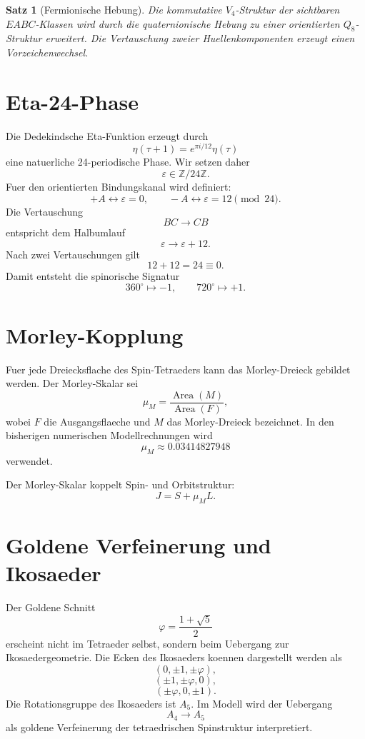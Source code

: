 \documentclass[11pt,a4paper]{article}
\newtheorem{satz}{Satz}[section]
\theoremstyle{definition}
\theoremstyle{remark}
\DeclareMathOperator{\Area}{Area}
\newcommand{\Z}{\mathbb Z}
\newcommand{\eps}{\varepsilon}
\newcommand{\phig}{\varphi}
\begin{document}
\begin{satz}[Fermionische Hebung]
Die kommutative \(V_4\)-Struktur der sichtbaren \(EABC\)-Klassen wird durch die
quaternionische Hebung zu einer orientierten \(Q_8\)-Struktur erweitert. Die
Vertauschung zweier Huellenkomponenten erzeugt einen Vorzeichenwechsel.
\end{satz}

\section{Eta-24-Phase}

Die Dedekindsche Eta-Funktion erzeugt durch
\[
\eta(\tau+1)=e^{\pi i/12}\eta(\tau)
\]
eine natuerliche 24-periodische Phase. Wir setzen daher
\[
\eps\in\Z/24\Z.
\]
Fuer den orientierten Bindungskanal wird definiert:
\[
+A\leftrightarrow \eps=0,
\qquad
-A\leftrightarrow \eps=12\pmod{24}.
\]
Die Vertauschung
\[
BC\longrightarrow CB
\]
entspricht dem Halbumlauf
\[
\eps\longrightarrow \eps+12.
\]
Nach zwei Vertauschungen gilt
\[
12+12=24\equiv 0.
\]
Damit entsteht die spinorische Signatur
\[
360^\circ\mapsto -1,
\qquad
720^\circ\mapsto +1.
\]

\section{Morley-Kopplung}

Fuer jede Dreiecksflache des Spin-Tetraeders kann das Morley-Dreieck gebildet
werden. Der Morley-Skalar sei
\[
\mu_M=\frac{\Area(M)}{\Area(F)},
\]
wobei \(F\) die Ausgangsflaeche und \(M\) das Morley-Dreieck bezeichnet. In den
bisherigen numerischen Modellrechnungen wird
\[
\mu_M\approx 0.03414827948
\]
verwendet.

Der Morley-Skalar koppelt Spin- und Orbitstruktur:
\[
J=S+\mu_M L.
\]

\section{Goldene Verfeinerung und Ikosaeder}

Der Goldene Schnitt
\[
\phig=\frac{1+\sqrt5}{2}
\]
erscheint nicht im Tetraeder selbst, sondern beim Uebergang zur
Ikosaedergeometrie. Die Ecken des Ikosaeders koennen dargestellt werden als
\[
(0,\pm1,\pm\phig),
\]
\[
(\pm1,\pm\phig,0),
\]
\[
(\pm\phig,0,\pm1).
\]
Die Rotationsgruppe des Ikosaeders ist \(A_5\). Im Modell wird der Uebergang
\[
A_4\longrightarrow A_5
\]
als goldene Verfeinerung der tetraedrischen Spinstruktur interpretiert.
\end{document}
